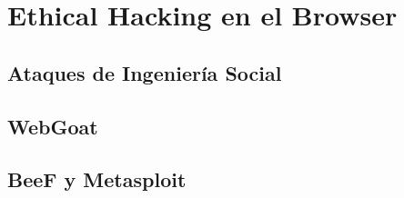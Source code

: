 %


\section{Ethical Hacking en el Browser}
\label{sec:chap3.2}
%

\subsection{Ataques de Ingeniería Social}
\label{sec:chap3.2.1}
%

\subsection{WebGoat}
\label{sec:chap3.2.2}
%

\subsection{BeeF y Metasploit}
\label{sec:chap3.2.3}
%





